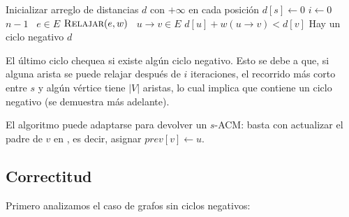 \documentclass[a4paper]{report}
\newcommand{\Each}{\kw{each}\ }
\begin{document}
\begin{codebox}
    \li Inicializar arreglo de distancias $d$ con $+\infty$ en cada posición
    \li $d[s] \gets 0$
    \li \For $i \gets 0$ \To $n - 1$ \Do
    \li \For \Each $e \in E$ \Do
    \li $\textnormal{\scshape Relajar}(e, w)$
    \End
    \End
    \li \For \Each $u \rightarrow v \in E$ \Do
    \li \If $d[u] + w(u \rightarrow v) < d[v]$ \Then
    \li \Return Hay un ciclo negativo
    \End
    \End
    \li \Return $d$
\end{codebox}

El último ciclo chequea si existe algún ciclo negativo. Esto se debe a que, si alguna arista se puede relajar después de $i$ iteraciones, el recorrido más corto entre $s$ y algún vértice tiene $|V|$ aristas, lo cual implica que contiene un ciclo negativo (se demuestra más adelante).

El algoritmo puede adaptarse para devolver un $s$-ACM: basta con actualizar el padre de $v$ en , es decir, asignar $prev[v] \gets u$.

\subsection{Correctitud}

Primero analizamos el caso de grafos sin ciclos negativos:
\end{document}
